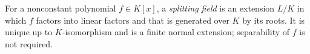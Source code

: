 
For a nonconstant polynomial $f\in K[x]$, a \emph{splitting field} is an extension $L/K$ in which $f$ factors into linear factors and that is generated over $K$ by its roots. It is unique up to $K$-isomorphism and is a finite normal extension; separability of $f$ is not required.
